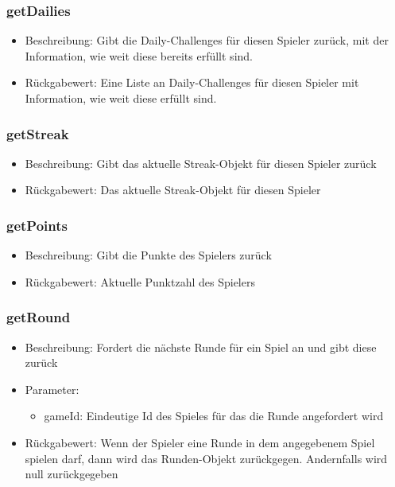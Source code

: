\documentclass[a4paper]{scrreprt}
\begin{document}
    \subsubsection{getDailies}
    \begin{itemize}
        \item Beschreibung: Gibt die Daily-Challenges für diesen Spieler zurück, mit der Information, wie weit diese bereits erfüllt sind.
        \item Rückgabewert: Eine Liste an Daily-Challenges für diesen Spieler mit Information, wie weit diese erfüllt sind.
    \end{itemize}
    \subsubsection{getStreak}
    \begin{itemize}
        \item Beschreibung: Gibt das aktuelle Streak-Objekt für diesen Spieler zurück
        \item Rückgabewert: Das aktuelle Streak-Objekt für diesen Spieler 
    \end{itemize}
    \subsubsection{getPoints}
    \begin{itemize}
        \item Beschreibung: Gibt die Punkte des Spielers zurück
        \item Rückgabewert: Aktuelle Punktzahl des Spielers 
    \end{itemize}
    \subsubsection{getRound}
    \begin{itemize}
        \item Beschreibung: Fordert die nächste Runde für ein Spiel an und gibt diese zurück
        \item Parameter:
        \begin{itemize}
            \item gameId: Eindeutige Id des Spieles für das die Runde angefordert wird
        \end{itemize}
        \item Rückgabewert: Wenn der Spieler eine Runde in dem angegebenem Spiel spielen darf, dann wird das Runden-Objekt zurückgegen. Andernfalls wird null zurückgegeben 
    \end{itemize}
\end{document}
